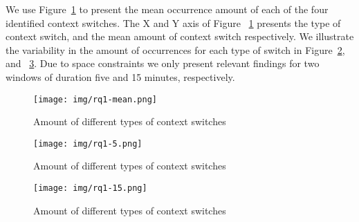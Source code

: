 We use Figure~\ref{rq1-mean} to present the mean occurrence amount of each of the four identified context switches. The X and Y axis of Figure ~\ref{rq1-mean} presents the type of context switch, and the mean amount of context switch respectively. We illustrate the variability in the amount of occurrences for each type of switch in Figure~\ref{rq1-var-5}, and ~\ref{rq1-var-15}. Due to space constraints we only present relevant findings for two windows of duration five and 15 minutes, respectively. 
 
\begin{figure}[htbp]
\centering
\texttt{[image: img/rq1-mean.png]}
\caption{Amount of different types of context switches}
\label{rq1-mean}
\end{figure}

\begin{figure}[htbp]
\centering
\texttt{[image: img/rq1-5.png]}
\caption{Amount of different types of context switches}
\label{rq1-var-5}
\end{figure}

\begin{figure}[htbp]
\centering
\texttt{[image: img/rq1-15.png]}
\caption{Amount of different types of context switches}
\label{rq1-var-15}
\end{figure} 
 
%

